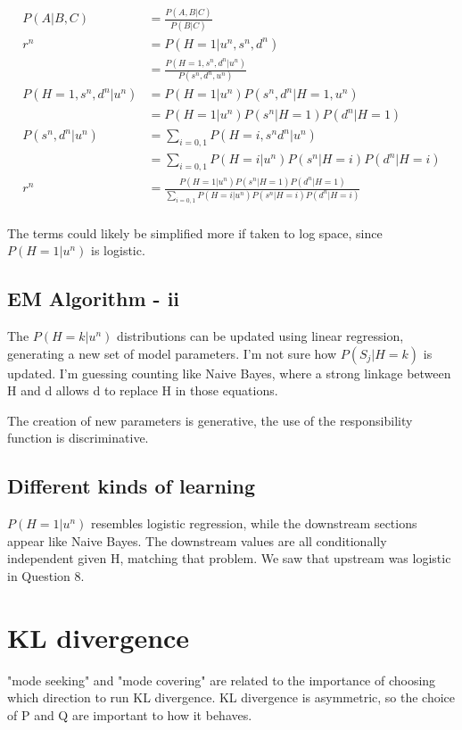 \documentclass[11pt]{article}
\begin{document}
\begin{align}
	P(A|B,C) &= \frac{P(A,B|C)}{P(B|C)} \\
	r^n &= P(H=1|u^n,s^n,d^n) \\
	&= \frac{P(H=1,s^n,d^n|u^n)}{P(s^n,d^n,u^n)} \\
	P(H=1,s^n,d^n|u^n) &= P(H=1|u^n)P(s^n,d^n|H=1,u^n) \\
	&= P(H=1|u^n)P(s^n|H=1)P(d^n|H=1) \\
	P(s^n,d^n|u^n) &= \sum_{i=0,1} P(H=i,s^nd^n|u^n) \\
	&= \sum_{i={0,1}} P(H=i|u^n)P(s^n|H=i)P(d^n|H=i)	\\
	r^n &= \frac{ P(H=1|u^n)P(s^n|H=1)P(d^n|H=1)}{\sum_{i={0,1}} P(H=i|u^n)P(s^n|H=i)P(d^n|H=i)} \\
\end{align}

The terms could likely be simplified more if taken to log space, since $P(H=1|u^n)$ is logistic.

\subsection{EM Algorithm - ii}

The $P(H=k|u^n)$ distributions can be updated using linear regression, generating a new set of model parameters. I'm not sure how $P(S_j|H=k)$ is updated. I'm guessing counting like Naive Bayes, where a strong linkage between H and d allows d to replace H in those equations.

The creation of new parameters is generative, the use of the responsibility function is discriminative.

\subsection{Different kinds of learning}

$P(H=1|u^n)$ resembles logistic regression, while the downstream sections appear like Naive Bayes. The downstream values are all conditionally independent given H, matching that problem. We saw that upstream was logistic in Question 8.


\section{KL divergence}

"mode seeking" and "mode covering" are related to the importance of choosing which direction to run KL divergence. KL divergence is asymmetric, so the choice of P and Q are important to how it behaves.
\end{document}
